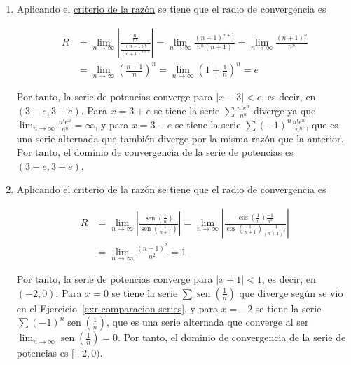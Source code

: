 \documentclass[
  spanish,
  a4paper,
]{scrreport}
\theoremstyle{definition}
\theoremstyle{remark}
\begin{document}
\begin{tcolorbox}
\begin{enumerate}
  \[
   R = \lim_{n\to\infty} \left|\frac{\frac{1}{n^3}}{\frac{1}{(n+1)^3}}\right| = \lim_{n\to\infty} \frac{(n+1)^3}{n^3} = 1.
   \]

  Por tanto, la serie de potencias converge para \(|x-2|<1\), es decir,
  en \((1,3)\). Para \(x=1\) se tiene la serie
  \(\sum \frac{(-1)^n}{n^3}\), que es una serie alternada que converge
  ya que \(\lim_{n\to\infty} \frac{1}{n^3} = 0\), y para \(x=3\) se
  tiene la serie \(\sum \frac{1}{n^3}\) que también converge al ser una
  serie \(p\) con \(p>1\). Por tanto, el dominio de convergencia de la
  serie de potencias es \([1,3]\).
\item
  Aplicando el
  \href{https://aprendeconalf.es/analisis-manual/08-series.html\#thm-radio-convergencia-raiz}{criterio
  de la razón} se tiene que el radio de convergencia es

  \begin{align*}
   R &= \lim_{n\to\infty} \left|\frac{\frac{n!}{n^n}}{\frac{(n+1)!}{(n+1)^{n+1}}}\right| = \lim_{n\to\infty} \frac{(n+1)^{n+1}}{n^n (n+1)} = \lim_{n\to\infty} \frac{(n+1)^n}{n^n }\\
   & = \lim_{n\to\infty} \left(\frac{n+1}{n}\right)^n = \lim_{n\to\infty} \left(1+\frac{1}{n}\right)^n = e
   \end{align*}

  Por tanto, la serie de potencias converge para \(|x-3|<e\), es decir,
  en \((3-e,3+e)\). Para \(x=3+e\) se tiene la serie
  \(\sum \frac{n!e^n}{n^n}\) diverge ya que
  \(\lim_{n\to\infty} \frac{n!e^n}{n^n}=\infty\), y para \(x=3-e\) se
  tiene la serie \(\sum (-1)^n\frac{n!e^n}{n^n}\), que es una serie
  alternada que también diverge por la misma razón que la anterior. Por
  tanto, el dominio de convergencia de la serie de potencias es
  \((3-e,3+e)\).
\item
  Aplicando el
  \href{https://aprendeconalf.es/analisis-manual/08-series.html\#thm-radio-convergencia-raiz}{criterio
  de la razón} se tiene que el radio de convergencia es

  \begin{align*}
   R &= \lim_{n\to\infty} \left|\frac{\operatorname{sen}\left(\frac{1}{n}\right)}{\operatorname{sen}\left(\frac{1}{n+1}\right)}\right| 
   = \lim_{n\to\infty} \left|\frac{\cos\left(\frac{1}{n}\right)\frac{-1}{n^2}}{\cos\left(\frac{1}{n+1}\right)\frac{-1}{(n+1)^2}}\right| \tag{L'Hôpital}\\
   & = \lim_{n\to\infty} \frac{(n+1)^2}{n^2} 
   = 1
   \end{align*}

  Por tanto, la serie de potencias converge para \(|x+1|<1\), es decir,
  en \((-2,0)\). Para \(x=0\) se tiene la serie
  \(\sum \operatorname{sen}\left(\frac{1}{n}\right)\) que diverge según
  se vio en el Ejercicio~\ref{exr-comparacion-series}, y para \(x=-2\)
  se tiene la serie
  \(\sum (-1)^n\operatorname{sen}\left(\frac{1}{n}\right)\), que es una
  serie alternada que converge al ser
  \(\lim_{n\to\infty} \operatorname{sen}\left(\frac{1}{n}\right)=0\).
  Por tanto, el dominio de convergencia de la serie de potencias es
  \([-2,0)\).
\end{enumerate}

\end{tcolorbox}
\end{document}
